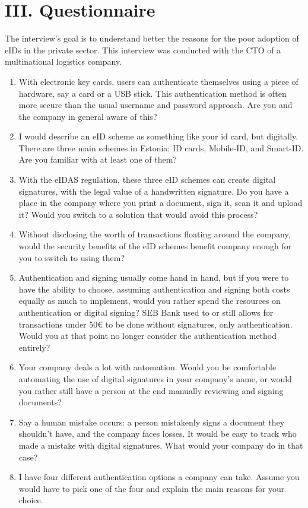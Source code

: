 \section*{III. Questionnaire}

The interview's goal is to understand better the reasons for the poor adoption of eIDs in the private sector. This interview was conducted with the CTO of a multinational logistics company.

\begin{enumerate}
    \item With electronic key cards, users can authenticate themselves using a piece of hardware, say a card or a USB stick. This authentication method is often more secure than the usual username and password approach. Are you and the company in general aware of this?
    \item I would describe an eID scheme as something like your id card, but digitally. There are three main schemes in Estonia: ID cards, Mobile-ID, and Smart-ID. Are you familiar with at least one of them?
    \item With the eIDAS regulation, these three eID schemes can create digital signatures, with the legal value of a handwritten signature. Do you have a place in the company where you print a document, sign it, scan it and upload it? Would you switch to a solution that would avoid this process?
    \item Without disclosing the worth of transactions floating around the company, would the security benefits of the eID schemes benefit company enough for you to switch to using them?
    \item Authentication and signing usually come hand in hand, but if you were to have the ability to choose, assuming authentication and signing both costs equally as much to implement, would you rather spend the resources on authentication or digital signing? SEB Bank used to or still allows for transactions under 50€ to be done without signatures, only authentication. Would you at that point no longer consider the authentication method entirely?
    \item Your company deals a lot with automation. Would you be comfortable automating the use of digital signatures in your company's name, or would you rather still have a person at the end manually reviewing and signing documents?
    \item Say a human mistake occurs: a person mistakenly signs a document they shouldn't have, and the company faces losses. It would be easy to track who made a mistake with digital signatures. What would your company do in that case?
    \item I have four different authentication options a company can take. Assume you would have to pick one of the four and explain the main reasons for your choice.
    

\end{enumerate}
